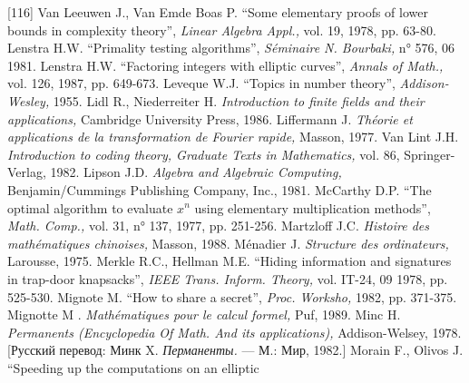\documentclass{../../template/mai_book}
\begin{document}
[116] Van Leeuwen J., Van Emde Boas P. “Some elementary proofs of
lower bounds in complexity theory”, {\itshape Linear Algebra Appl.,} vol. 19, 1978, pp. 63-80. \newline
[117] Lenstra H.W. “Primality testing algorithms”, {\itshape S\'{e}minaire N. Bourbaki,} n° 576, 06 1981. \newline
[118] Lenstra H.W. “Factoring integers with elliptic curves”, {\itshape Annals of Math.,} vol. 126, 1987, pp. 649-673. \newline
[119] Leveque W.J. “Topics in number theory”, {\itshape Addison-Wesley,} 1955. \newline
[120] Lidl R., Niederreiter H. {\itshape Introduction to finite fields and their applications,} Cambridge University Press, 1986. \newline
[121] Liffermann J. {\itshape Th\'{e}orie et applications de la transformation de Fourier rapide,} Masson, 1977. \newline
[122] Van Lint J.H. {\itshape Introduction to coding theory, Graduate Texts in Mathematics,} vol. 86, Springer-Verlag, 1982. \newline
[123] Lipson J.D. {\itshape Algebra and Algebraic Computing,} Benjamin/Cummings \newline Publishing Company, Inc., 1981. \newline
[124] McCarthy D.P. “The optimal algorithm to evaluate $x^n$ using elementary multiplication methods”, {\itshape Math. Comp.,} vol. 31, n° 137, 1977, pp. 251-256. \newline
[125] Martzloff J.C. {\itshape Histoire des math\'{e}matiques chinoises,} Masson, 1988. \newline
[126] M\'{e}nadier J. {\itshape Structure des ordinateurs,} Larousse, 1975. \newline
[127] Merkle R.C., Hellman M.E. “Hiding information and signatures in
trap-door knapsacks”, {\itshape IEEE Trans. Inform. Theory,} vol. IT-24, 09 1978, pp. 525-530. \newline
[128] Mignote M. “How to share a secret”, {\itshape Proc. Worksho,} 1982, pp. 371-375. \newline
[129] Mignotte M . {\itshape Math\'{e}matiques pour le calcul formel,} Puf, 1989. \newline
[130] Minc H. {\itshape Permanents (Encyclopedia Of Math. And its applications),} Addison-Welsey, 1978. [Русский перевод: Минк X. {\itshape Перманенты.} — М.: Мир, 1982.] \newline
[131] Morain F., Olivos J. “Speeding up the computations on an elliptic
\end{document}
